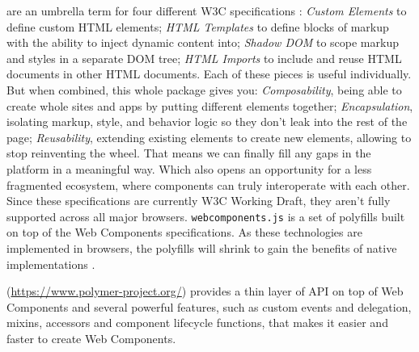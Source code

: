 \begin{description}
\itemsep1pt\parskip0pt

\item[Web Components] are an umbrella term for four different W3C specifications \cite{w3c}:
\emph{Custom Elements} to define custom HTML elements;
\emph{HTML Templates} to define blocks of markup with the ability to inject dynamic content into;
\emph{Shadow DOM} to scope markup and styles in a separate DOM tree;
\emph{HTML Imports} to include and reuse HTML documents in other HTML documents.
Each of these pieces is useful individually. But when combined, this whole package gives you:
\emph{Composability}, being able to create whole sites and apps by putting different elements together;
\emph{Encapsulation}, isolating markup, style, and behavior logic so they don’t leak into the rest of the page;
\emph{Reusability}, extending existing elements to create new elements, allowing to stop reinventing the wheel.
That means we can finally fill any gaps in the platform in a meaningful way. Which also opens an opportunity for a less fragmented ecosystem, where components can truly interoperate with each other.
Since these specifications are currently W3C Working Draft, they aren’t fully supported across all major browsers. \texttt{webcomponents.js} is a set of polyfills built on top of the Web Components specifications. 
As these technologies are implemented in browsers, the polyfills will shrink to gain the benefits of native implementations \cite{webcomponents-polyfills}. 
        
\item[Polymer library] (\url{https://www.polymer-project.org/}) provides a thin layer of API on top of Web Components and several powerful features, such as custom events and delegation, mixins, accessors and component lifecycle functions, that makes it easier and faster to create Web Components. 
\end{description}


 
